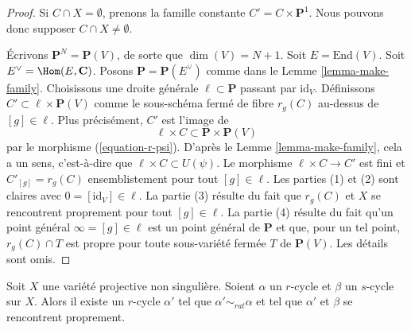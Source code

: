 \begin{proof}
Si $C \cap X = \emptyset$, prenons la famille constante
$C' = C \times \mathbf{P}^1$. Nous pouvons donc supposer
$C \cap X \not = \emptyset$.

\medskip\noindent
Écrivons $\mathbf{P}^N = \mathbf{P}(V)$, de sorte que $\dim(V) = N + 1$. Soit
$E = \text{End}(V)$. Soit $E^\vee = \Hom(E, \mathbf{C})$. Posons
$\mathbf{P} = \mathbf{P}(E^\vee)$ comme dans le Lemme \ref{lemma-make-family}.
Choisissons une droite générale $\ell \subset \mathbf{P}$ passant par $\text{id}_V$.
Définissons $C' \subset \ell \times \mathbf{P}(V)$ comme le
sous-schéma fermé de fibre $r_g(C)$ au-dessus de $[g] \in \ell$.
Plus précisément, $C'$ est l'image de
$$
\ell \times C \subset \mathbf{P} \times \mathbf{P}(V)
$$
par le morphisme (\ref{equation-r-psi}). D'après le Lemme \ref{lemma-make-family},
cela a un sens, c'est-à-dire que $\ell \times C \subset U(\psi)$. Le morphisme
$\ell \times C \to C'$ est fini et $C'_{[g]} = r_g(C)$ ensemblistement
pour tout $[g] \in \ell$. Les parties (1) et (2) sont claires avec
$0 = [\text{id}_V] \in \ell$. La partie (3) résulte du fait
que $r_g(C)$ et $X$ se rencontrent proprement pour tout $[g] \in \ell$.
La partie (4) résulte du fait qu'un point général $\infty = [g] \in \ell$
est un point général de $\mathbf{P}$ et que, pour un tel point,
$r_g(C) \cap T$ est propre pour toute sous-variété fermée $T$ de $\mathbf{P}(V)$.
Les détails sont omis.
\end{proof}

\begin{lemma}
\label{lemma-moving-move}
Soit $X$ une variété projective non singulière. Soient $\alpha$ un
$r$-cycle et $\beta$ un $s$-cycle sur $X$. Alors il existe
un $r$-cycle $\alpha'$ tel que $\alpha' \sim_{rat} \alpha$ et
tel que $\alpha'$ et $\beta$ se rencontrent proprement.
\end{lemma}

